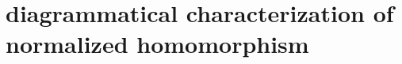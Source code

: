 \documentclass{extarticle}
\newtheorem{theorem}{Theorem}
\newtheorem{lemma}[theorem]{Lemma}
\newcommand{\At}{\mathbf{At}}
\newcommand{\clos}[1]{\mathrel{\overline{#1}}}
\begin{document}





\printbibliography

\newpage
\appendix

\section{diagrammatical characterization of normalized homomorphism}\label{sec:diagram-of-norm-sim}
\end{document}
